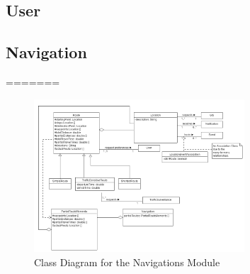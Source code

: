 \documentclass[runningheads,a4paper]{article}
\begin{document}
\subsection {User}



\subsection {Navigation}



=======
\begin{figure}[H]
   	\centering
   	\includegraphics[width=0.7\textwidth]{Navigation-Module-Class-Diagram.png}
   	\caption{Class Diagram for the Navigations Module}
\end{figure}
\end{document}
